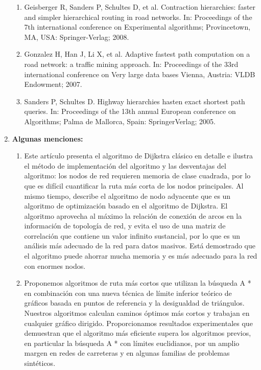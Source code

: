 \documentclass[a4,papper]{IEEEtran}
\begin{document}
\begin{enumerate}
\begin{enumerate}
    \item Geisberger R, Sanders P, Schultes D, et al. Contraction hierarchies: faster and simpler
hierarchical routing in road networks. In: Proceedings of the 7th international conference on
Experimental algorithms; Provincetown, MA, USA: Springer-Verlag; 2008.

    \item Gonzalez H, Han J, Li X, et al. Adaptive fastest path computation on a road network: a traffic
mining approach. In: Proceedings of the 33rd international conference on Very large data
bases Vienna, Austria: VLDB Endowment; 2007.

    \item Sanders P, Schultes D. Highway hierarchies hasten exact shortest path queries. In: Proceedings of
the 13th annual European conference on Algorithms; Palma de Mallorca, Spain: SpringerVerlag;
2005.

\end{enumerate}



\newpage
\item {\noindent \large \bf {Algunas menciones:}}

\begin{enumerate}
    \item Este artículo presenta el algoritmo de Dijkstra clásico en detalle e ilustra el método de implementación del algoritmo y las desventajas del algoritmo: los nodos de red requieren memoria de clase cuadrada, por lo que es difícil cuantificar la ruta más corta de los nodos principales. Al mismo tiempo, describe el algoritmo de nodo adyacente que es un algoritmo de optimización basado en el algoritmo de Dijkstra. El algoritmo aprovecha al máximo la relación de conexión de arcos en la información de topología de red, y evita el uso de una matriz de correlación que contiene un valor infinito sustancial, por lo que es un análisis más adecuado de la red para datos masivos. Está demostrado que el algoritmo puede ahorrar mucha memoria y es más adecuado para la red con enormes nodos.

\item Proponemos algoritmos de ruta más cortos que utilizan la búsqueda A * en combinación con una nueva técnica de límite inferior teórico de gráficos basada en puntos de referencia y la desigualdad de triángulos. Nuestros algoritmos calculan caminos óptimos más cortos y trabajan en cualquier gráfico dirigido. Proporcionamos resultados experimentales que demuestran que el algoritmo más eficiente supera los algoritmos previos, en particular la búsqueda A * con límites euclidianos, por un amplio margen en redes de carreteras y en algunas familias de problemas sintéticos.



\end{enumerate}
\end{enumerate}
\end{document}

